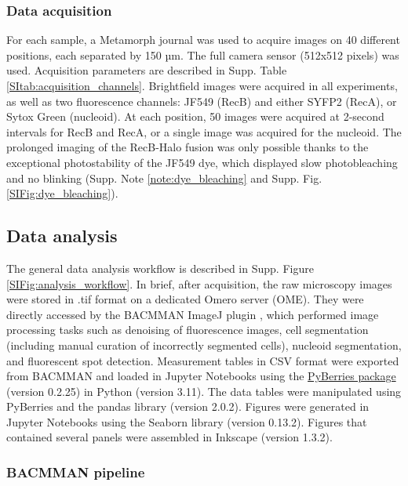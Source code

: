 \subsubsection*{Data acquisition}
For each sample, a Metamorph journal was used to acquire images on 40 different positions, each separated by 150 µm. The full camera sensor (512x512 pixels) was used. Acquisition parameters are described in Supp. Table \ref{SItab:acquisition_channels}. Brightfield images were acquired in all experiments, as well as two fluorescence channels: JF549 (RecB) and either SYFP2 (RecA), or Sytox Green (nucleoid). At each position, 50 images were acquired at 2-second intervals for RecB and RecA, or a single image was acquired for the nucleoid. The prolonged imaging of the RecB-Halo fusion was only possible thanks to the exceptional photostability of the JF549 dye, which displayed slow photobleaching and no blinking (Supp. Note \ref{note:dye_bleaching} and Supp. Fig. \ref{SIFig:dye_bleaching}).

\subsection*{Data analysis}
The general data analysis workflow is described in Supp. Figure \ref{SIFig:analysis_workflow}. In brief, after acquisition, the raw microscopy images were stored in .tif format on a dedicated Omero server (OME). They were directly accessed by the BACMMAN ImageJ plugin \cite{Ollion2019}, which performed image processing tasks such as denoising of fluorescence images, cell segmentation (including manual curation of incorrectly segmented cells), nucleoid segmentation, and fluorescent spot detection. Measurement tables in CSV format were exported from BACMMAN and loaded in Jupyter Notebooks using the \href{https://gitlab.com/MEKlab/pyberries}{PyBerries package} (version 0.2.25) in Python (version 3.11). The data tables were manipulated using PyBerries and the pandas library (version 2.0.2). Figures were generated in Jupyter Notebooks using the Seaborn library (version 0.13.2). Figures that contained several panels were assembled in Inkscape (version 1.3.2).

\subsubsection*{BACMMAN pipeline}
